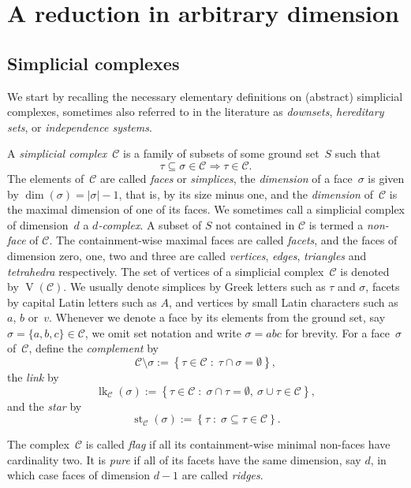 \documentclass[a4paper,12pt]{amsart}
\theoremstyle{plain}
\theoremstyle{definition}
\newcommand{\darkred}{\color{darkred}} %
\newcommand{\C}{\mathcal C}
\newcommand{\facetA}{A}
\newcommand{\face}{\sigma}
\newcommand{\smallface}{\tau}
\DeclareMathOperator{\link}{lk}
\DeclareMathOperator{\st}{st}
\DeclareMathOperator{\vertices}{V}
\newcommand{\defn}[1]{\emph{\darkred #1}} %
\newcommand{\set}[2]{\left\{ #1 \; : \; #2 \right\}}
\begin{document}
\section{A reduction in arbitrary dimension}
\label{sec:setting}

\subsection{Simplicial complexes}
\label{subsec:basic}
We start by recalling the necessary elementary definitions on (abstract) simplicial complexes, sometimes also referred to in the literature as \defn{downsets}, \defn{hereditary sets}, or \defn{independence systems}.

\medskip

A \defn{simplicial complex}~$\C$ is a family of subsets of some ground set~$S$ such that
\[
  \smallface \subseteq \face \in \C \Rightarrow \smallface \in \C.
\]
The elements of~$\C$ are called \defn{faces} or \defn{simplices}, the \defn{dimension} of a face~$\face$ is given by $\dim(\face) = |\face|-1$, that is, by its size minus one, and the \defn{dimension} of~$\C$ is the maximal dimension of one of its faces. 
We sometimes call a simplicial complex of dimension~$d$ a \defn{$d$-complex}. A subset of $S$ not contained in $\C$ is termed a \defn{non-face} of $\C$.
The containment-wise maximal faces are called \defn{facets}, and the faces of dimension zero, one, two and three are called \defn{vertices}, \defn{edges}, \defn{triangles} and \defn{tetrahedra} respectively. The set of vertices of a simplicial complex~$\C$ is denoted by $\vertices (\C)$.
We usually denote simplices by Greek letters such as $\smallface$ and $\face$, facets by capital Latin letters such as $\facetA$, and vertices by small Latin characters such as~$a$, $b$ or~$v$. Whenever we denote a face by its elements from the ground set, say $\face = \{a,b,c\} \in \C$, we omit set notation and write $\face = abc$ for brevity.
For a face~$\face$ of~$\C$, define the \defn{complement} by
\[
  \C \setminus \face := \set{ \smallface \in \C}{ \smallface \cap \face = \emptyset},
\]
the \defn{link} by
\[
  \link_\C(\face) := \set{ \smallface \in \C}{ \face \cap \smallface = \emptyset,\ \face \cup \smallface \in \C},
\]
and the \defn{star} by
\[
  \st_\C(\face) := \set{ \smallface }{\face \subseteq \smallface \in \C}.
\]

The complex~$\C$ is called \defn{flag} if all its containment-wise minimal non-faces have cardinality two.
It is \defn{pure} if all of its facets have the same dimension, say $d$, in which case faces of dimension $d-1$ are called \defn{ridges}. 
\end{document}
